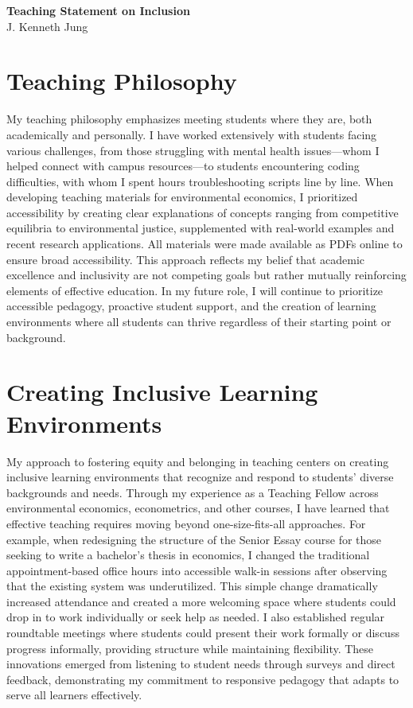 \documentclass[11pt,letterpaper]{article}
\newenvironment{cvheader}
{\begin{center}\Large}
{\end{center}}
\begin{document}
\begin{cvheader}
{\Huge\textbf{Teaching Statement on Inclusion}}\\
{\large\textcolor{mediumgray}{J. Kenneth Jung}}
\end{cvheader}

\vspace{8pt}

\section*{Teaching Philosophy}

My teaching philosophy emphasizes meeting students where they are, both academically and personally. I have worked extensively with students facing various challenges, from those struggling with mental health issues—whom I helped connect with campus resources—to students encountering coding difficulties, with whom I spent hours troubleshooting scripts line by line. When developing teaching materials for environmental economics, I prioritized accessibility by creating clear explanations of concepts ranging from competitive equilibria to environmental justice, supplemented with real-world examples and recent research applications. All materials were made available as PDFs online to ensure broad accessibility. This approach reflects my belief that academic excellence and inclusivity are not competing goals but rather mutually reinforcing elements of effective education. In my future role, I will continue to prioritize accessible pedagogy, proactive student support, and the creation of learning environments where all students can thrive regardless of their starting point or background.

\section*{Creating Inclusive Learning Environments}

My approach to fostering equity and belonging in teaching centers on creating inclusive learning environments that recognize and respond to students' diverse backgrounds and needs. Through my experience as a Teaching Fellow across environmental economics, econometrics, and other courses, I have learned that effective teaching requires moving beyond one-size-fits-all approaches. For example, when redesigning the structure of the Senior Essay course for those seeking to write a bachelor's thesis in economics, I changed the traditional appointment-based office hours into accessible walk-in sessions after observing that the existing system was underutilized. This simple change dramatically increased attendance and created a more welcoming space where students could drop in to work individually or seek help as needed. I also established regular roundtable meetings where students could present their work formally or discuss progress informally, providing structure while maintaining flexibility. These innovations emerged from listening to student needs through surveys and direct feedback, demonstrating my commitment to responsive pedagogy that adapts to serve all learners effectively.
\end{document}
